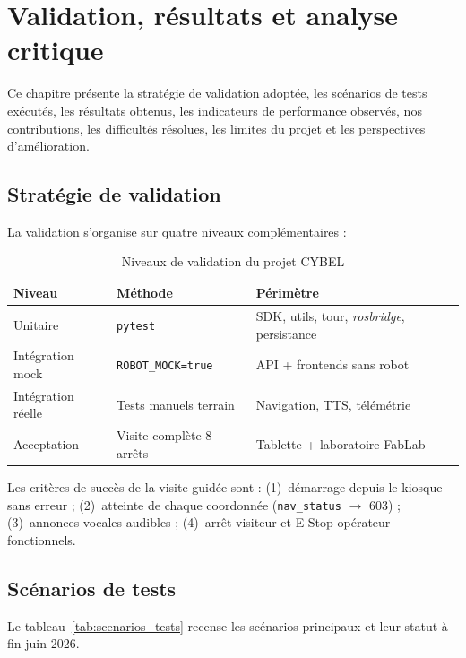 \newpage
\section{Validation, résultats et analyse critique}
\label{chap:Validation_result_ana_critique}

Ce chapitre présente la stratégie de validation adoptée, les scénarios de
tests exécutés, les résultats obtenus, les indicateurs de performance
observés, nos contributions, les difficultés résolues, les limites du projet
et les perspectives d'amélioration.


\subsection{Stratégie de validation}

La validation s'organise sur quatre niveaux complémentaires :

\begin{table}[H]
\centering
\caption{Niveaux de validation du projet CYBEL}
\label{tab:niveaux_validation}
\small
\begin{tabular}{|p{2.2cm}|p{3.7cm}|p{5.3cm}|}
\hline
\textbf{Niveau} & \textbf{Méthode} & \textbf{Périmètre} \\
\hline
Unitaire & \texttt{pytest} & SDK, utils, tour, \textit{rosbridge}, persistance \\
\hline
Intégration mock & \texttt{ROBOT\_MOCK=true} & API + frontends sans robot \\
\hline
Intégration réelle & Tests manuels terrain & Navigation, TTS, télémétrie \\
\hline
Acceptation & Visite complète 8 arrêts & Tablette + laboratoire FabLab \\
\hline
\end{tabular}
\end{table}

Les critères de succès de la visite guidée sont : (1)~démarrage depuis le
kiosque sans erreur ; (2)~atteinte de chaque coordonnée (\texttt{nav\_status}
$\rightarrow$ 603) ; (3)~annonces vocales audibles ; (4)~arrêt visiteur et
E-Stop opérateur fonctionnels.

\newpage
\subsection{Scénarios de tests}

Le tableau~\ref{tab:scenarios_tests} recense les scénarios principaux et leur
statut à fin juin 2026.

